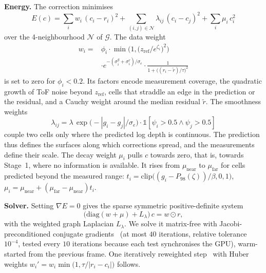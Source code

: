 \documentclass[conference]{IEEEtran}
\begin{document}
\textbf{Energy.} The correction minimises
\begin{equation}
  E(c)=\sum_{i} w_i\,(c_i-r_i)^2
      +\sum_{(i,j)\in\mathcal{N}} \lambda_{ij}\,(c_i-c_j)^2
      +\sum_i \mu_i\,c_i^2
  \label{eq:energy}
\end{equation}
over the 4-neighbourhood \(\mathcal{N}\) of \(\mathcal{G}\). The data weight
\begin{equation}
\begin{split}
  w_i={}&\phi_i\cdot\min\!\Big(1,\big(z_{\mathrm{ref}}/e^{\zeta_i}\big)^2\Big)\\
      &\cdot e^{-(\sigma^g_i+\sigma^r_i)/\sigma_e}
      \cdot\frac{1}{1+\big((r_i-\tilde r)/\tau\big)^2}
\end{split}
  \label{eq:wdata}
\end{equation}
is set to zero for \(\phi_i<0.2\). Its factors encode measurement coverage,
the quadratic growth of ToF noise beyond \(z_{\mathrm{ref}}\), cells that
straddle an edge in the prediction or the residual, and a Cauchy weight around
the median residual \(\tilde r\). The smoothness weights
\begin{equation}
  \lambda_{ij}=\lambda\,\exp\!\big(-|g_i-g_j|/\sigma_e\big)\cdot
               \mathbb{1}[\psi_i>0.5\wedge\psi_j>0.5]
\end{equation}
couple two cells only where the predicted log depth is continuous. The
prediction thus defines the surfaces along which corrections spread, and the
measurements define their scale. The decay weight \(\mu_i\) pulls \(c\)
towards zero, that is, towards Stage~1, where no information is available. It
rises from \(\mu_{\mathrm{near}}\) to \(\mu_{\mathrm{far}}\) for cells predicted
beyond the measured range: \(t_i=\mathrm{clip}\big((g_i-P_{98}(\zeta))/\beta,
0,1\big)\), \(\mu_i=\mu_{\mathrm{near}}+(\mu_{\mathrm{far}}-\mu_{\mathrm{near}})
t_i\).

\textbf{Solver.} Setting \(\nabla E=0\) gives the sparse symmetric
positive-definite system
\begin{equation}
  \big(\mathrm{diag}(w+\mu)+L_\lambda\big)\,c = w\odot r ,
  \label{eq:linsys}
\end{equation}
with the weighted graph Laplacian \(L_\lambda\). We solve it matrix-free with
Jacobi-preconditioned conjugate gradients~\cite{hestenes1952cg} (at most
\(40\) iterations, relative tolerance \(10^{-4}\), tested every \(10\)
iterations because each test synchronises the GPU), warm-started from the
previous frame. One iteratively reweighted step~\cite{holland1977irls} with
Huber weights \(w_i'=w_i\min\!\big(1,\tau/|r_i-c_i|\big)\) follows.
\end{document}
